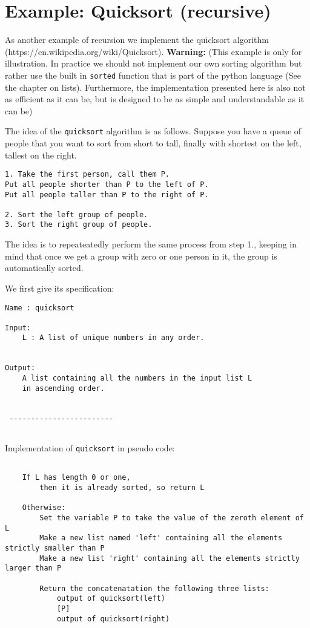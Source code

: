 \documentclass{report}
\begin{document}
\section{Example: Quicksort
(recursive)}\label{example-quicksort-recursive}

As another example of recursion we implement the quicksort algorithm
(https://en.wikipedia.org/wiki/Quicksort). \textbf{Warning:} (This
example is only for illustration. In practice we should not implement
our own sorting algorithm but rather use the built in \texttt{sorted}
function that is part of the python language (See the chapter on lists).
Furthermore, the implementation presented here is also not as efficient
as it can be, but is designed to be as simple and understandable as it
can be)

The idea of the \texttt{quicksort} algorithm is as follows. Suppose you
have a queue of people that you want to sort from short to tall, finally
with shortest on the left, tallest on the right.

\begin{verbatim}
1. Take the first person, call them P. 
Put all people shorter than P to the left of P. 
Put all people taller than P to the right of P.

2. Sort the left group of people.
3. Sort the right group of people.
\end{verbatim}

The idea is to repeateatedly perform the same process from step 1.,
keeping in mind that once we get a group with zero or one person in it,
the group is automatically sorted.

We first give its specification:

\begin{verbatim}
Name : quicksort

Input:
    L : A list of unique numbers in any order.
    
    
Output:
    A list containing all the numbers in the input list L
    in ascending order.
    
    
 ------------------------
        
\end{verbatim}

Implementation of \texttt{quicksort} in pseudo code:

\begin{verbatim}

    If L has length 0 or one, 
        then it is already sorted, so return L

    Otherwise:
        Set the variable P to take the value of the zeroth element of L        
        Make a new list named 'left' containing all the elements strictly smaller than P        
        Make a new list 'right' containing all the elements strictly larger than P
        
        Return the concatenatation the following three lists:
            output of quicksort(left)
            [P]
            output of quicksort(right)
        

\end{verbatim}
\end{document}
